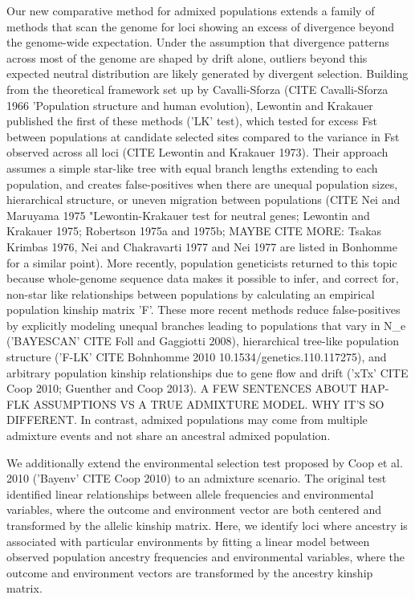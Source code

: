 \documentclass[12pt]{report}
\begin{document}
Our new comparative method for admixed populations extends a family of methods that scan the genome for loci showing an excess of divergence beyond the genome-wide expectation. Under the assumption that divergence patterns across most of the genome are shaped by drift alone, outliers beyond this expected neutral distribution are likely generated by divergent selection. Building from the theoretical framework set up by Cavalli-Sforza (CITE Cavalli-Sforza 1966 'Population structure and human evolution), Lewontin and Krakauer published the first of these methods ('LK' test), which tested for excess Fst between populations at candidate selected sites compared to the variance in Fst observed across all loci (CITE Lewontin and Krakauer 1973). Their approach assumes a simple star-like tree with equal branch lengths extending to each population, and creates false-positives when there are unequal population sizes, hierarchical structure, or uneven migration between populations (CITE Nei and Maruyama 1975 "Lewontin-Krakauer test for neutral genes; Lewontin and Krakauer 1975; Robertson 1975a and 1975b; MAYBE CITE MORE: Tsakas Krimbas 1976, Nei and Chakravarti 1977 and Nei 1977 are listed in Bonhomme for a similar point). More recently, population geneticists returned to this topic because whole-genome sequence data makes it possible to infer, and correct for, non-star like relationships between populations by calculating an empirical population kinship matrix 'F'. 
These more recent methods reduce false-positives by explicitly modeling unequal branches leading to populations that vary in N_{e} ('BAYESCAN' CITE Foll and Gaggiotti 2008), hierarchical tree-like population structure ('F-LK' CITE Bohnhomme 2010 10.1534/genetics.110.117275), and arbitrary population kinship relationships due to gene flow and drift ('xTx' CITE Coop 2010;  Guenther and Coop 2013).
A FEW SENTENCES ABOUT HAP-FLK ASSUMPTIONS VS A TRUE ADMIXTURE MODEL. WHY IT'S SO DIFFERENT.
In contrast, admixed populations may come from multiple admixture events and not share an ancestral admixed population. 

We additionally extend the environmental selection test proposed by Coop et al. 2010 ('Bayenv' CITE Coop 2010) to an admixture scenario. The original test identified linear relationships between allele frequencies and environmental variables, where the outcome and environment vector are both centered and transformed by the allelic kinship matrix. Here, we identify loci where ancestry is associated with particular environments by fitting a linear model between observed population ancestry frequencies and environmental variables, where the outcome and environment vectors are transformed by the ancestry kinship matrix.
 
\end{document}
